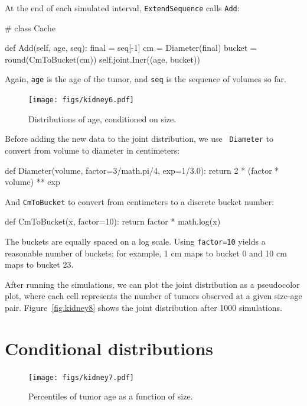 \documentclass[12pt]{book}
\theoremstyle{exercise}
\newcommand{\py}[1]{{\tt #1}}%
\begin{document}
At the end of each simulated interval, \py{ExtendSequence} calls
\py{Add}:

\begin{code}
# class Cache

    def Add(self, age, seq):
        final = seq[-1]
        cm = Diameter(final)
        bucket = round(CmToBucket(cm))
        self.joint.Incr((age, bucket))
\end{code}

Again, \py{age} is the age of the tumor, and \py{seq} is the
sequence of volumes so far.

\begin{figure}
\centerline{\texttt{[image: figs/kidney6.pdf]}}
\caption{Distributions of age, conditioned on size.}
\label{fig.kidney6}
\end{figure}

Before adding the new data to the joint distribution, we use {\tt
  Diameter} to convert from volume to diameter in centimeters:

\begin{code}
def Diameter(volume, factor=3/math.pi/4, exp=1/3.0):
    return 2 * (factor * volume) ** exp
\end{code}

And
\py{CmToBucket} to convert from centimeters to a discrete bucket
number:

\begin{code}
def CmToBucket(x, factor=10):
    return factor * math.log(x)
\end{code}

The buckets are equally spaced on a log scale.  Using \py{factor=10}
yields a reasonable number of buckets; for example,
1 cm maps to bucket 0 and 10 cm maps to bucket 23.

After running the simulations, we can plot the joint distribution
as a pseudocolor plot, where each cell represents the number of
tumors observed at a given size-age pair.
Figure~\ref{fig.kidney8} shows the joint distribution after 1000
simulations.



\section{Conditional distributions}

\begin{figure}
\centerline{\texttt{[image: figs/kidney7.pdf]}}
\caption{Percentiles of tumor age as a function of size.}
\label{fig.kidney7}
\end{figure}
\end{document}

